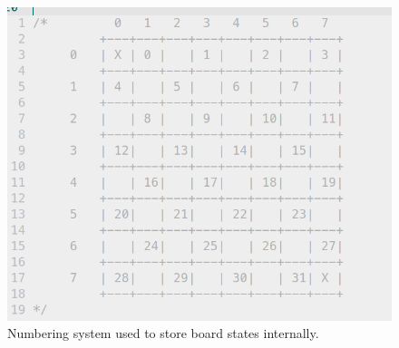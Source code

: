 \documentclass{article}
\begin{document}
\begin{figure}
    \includegraphics[width=\linewidth]{images/board-key.png}
    \caption{Numbering system used to store board states internally.}
    \label{fig:board-key}
\end{figure}
\end{document}
